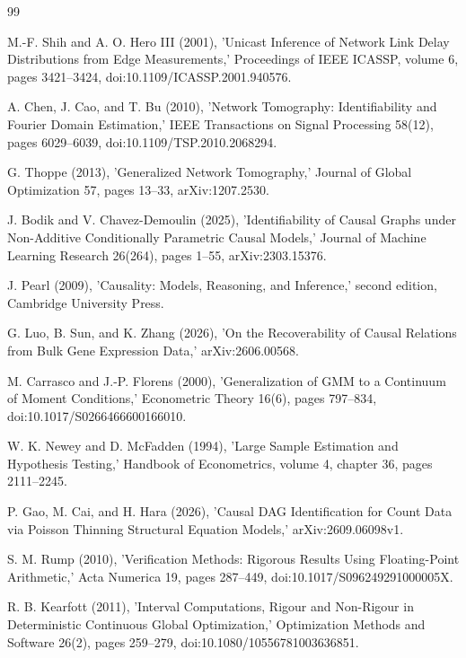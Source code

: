 \documentclass{article}
\begin{document}
\begin{thebibliography}{99}

   M.-F. Shih and A. O. Hero III (2001), 'Unicast Inference of Network Link Delay Distributions from Edge Measurements,' Proceedings of IEEE ICASSP, volume 6, pages 3421--3424, doi:10.1109/ICASSP.2001.940576.

   A. Chen, J. Cao, and T. Bu (2010), 'Network Tomography: Identifiability and Fourier Domain Estimation,' IEEE Transactions on Signal Processing 58(12), pages 6029--6039, doi:10.1109/TSP.2010.2068294.

   G. Thoppe (2013), 'Generalized Network Tomography,' Journal of Global Optimization 57, pages 13--33, arXiv:1207.2530.

   J. Bodik and V. Chavez-Demoulin (2025), 'Identifiability of Causal Graphs under Non-Additive Conditionally Parametric Causal Models,' Journal of Machine Learning Research 26(264), pages 1--55, arXiv:2303.15376.

   J. Pearl (2009), 'Causality: Models, Reasoning, and Inference,' second edition, Cambridge University Press.

   G. Luo, B. Sun, and K. Zhang (2026), 'On the Recoverability of Causal Relations from Bulk Gene Expression Data,' arXiv:2606.00568.

   M. Carrasco and J.-P. Florens (2000), 'Generalization of GMM to a Continuum of Moment Conditions,' Econometric Theory 16(6), pages 797--834, doi:10.1017/S0266466600166010.

   W. K. Newey and D. McFadden (1994), 'Large Sample Estimation and Hypothesis Testing,' Handbook of Econometrics, volume 4, chapter 36, pages 2111--2245.

   P. Gao, M. Cai, and H. Hara (2026), 'Causal DAG Identification for Count Data via Poisson Thinning Structural Equation Models,' arXiv:2609.06098v1.

   S. M. Rump (2010), 'Verification Methods: Rigorous Results Using Floating-Point Arithmetic,' Acta Numerica 19, pages 287--449, doi:10.1017/S096249291000005X.

   R. B. Kearfott (2011), 'Interval Computations, Rigour and Non-Rigour in Deterministic Continuous Global Optimization,' Optimization Methods and Software 26(2), pages 259--279, doi:10.1080/10556781003636851.


\end{thebibliography}
\end{document}
